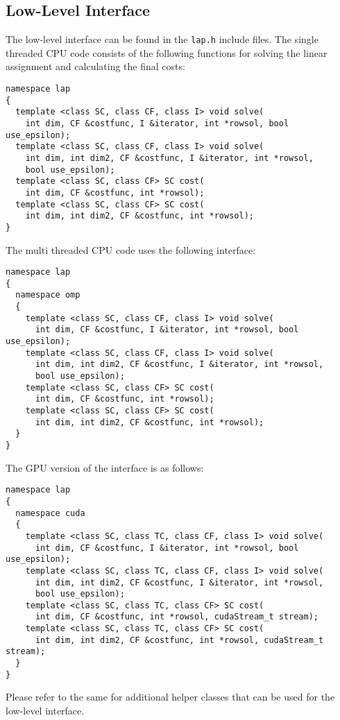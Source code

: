 \documentclass[format=acmsmall,review=false, screen=true]{acmart}
\begin{document}
\subsection{Low-Level Interface}
The low-level interface can be found in the \texttt{lap.h} include files. The single threaded CPU code consists of the following functions for solving the linear assignment and calculating the final costs:
\begin{verbatim}
namespace lap
{
  template <class SC, class CF, class I> void solve(
    int dim, CF &costfunc, I &iterator, int *rowsol, bool use_epsilon);
  template <class SC, class CF, class I> void solve(
    int dim, int dim2, CF &costfunc, I &iterator, int *rowsol, 
    bool use_epsilon);
  template <class SC, class CF> SC cost(
    int dim, CF &costfunc, int *rowsol);
  template <class SC, class CF> SC cost(
    int dim, int dim2, CF &costfunc, int *rowsol);
}
\end{verbatim}
The multi threaded CPU code uses the following interface:
\begin{verbatim}
namespace lap
{
  namespace omp
  {
    template <class SC, class CF, class I> void solve(
      int dim, CF &costfunc, I &iterator, int *rowsol, bool use_epsilon);
    template <class SC, class CF, class I> void solve(
      int dim, int dim2, CF &costfunc, I &iterator, int *rowsol, 
      bool use_epsilon);
    template <class SC, class CF> SC cost(
      int dim, CF &costfunc, int *rowsol);
    template <class SC, class CF> SC cost(
      int dim, int dim2, CF &costfunc, int *rowsol);
  }
}
\end{verbatim}
The GPU version of the interface is as follows:
\begin{verbatim}
namespace lap
{
  namespace cuda
  {
    template <class SC, class TC, class CF, class I> void solve(
      int dim, CF &costfunc, I &iterator, int *rowsol, bool use_epsilon);
    template <class SC, class TC, class CF, class I> void solve(
      int dim, int dim2, CF &costfunc, I &iterator, int *rowsol, 
      bool use_epsilon);
    template <class SC, class TC, class CF> SC cost(
      int dim, CF &costfunc, int *rowsol, cudaStream_t stream);
    template <class SC, class TC, class CF> SC cost(
      int dim, int dim2, CF &costfunc, int *rowsol, cudaStream_t stream);
  }
}
\end{verbatim}

Please refer to the same for additional helper classes that can be used for the low-level interface.

%
%
%
%
%
%
%

%
%
\end{document}

